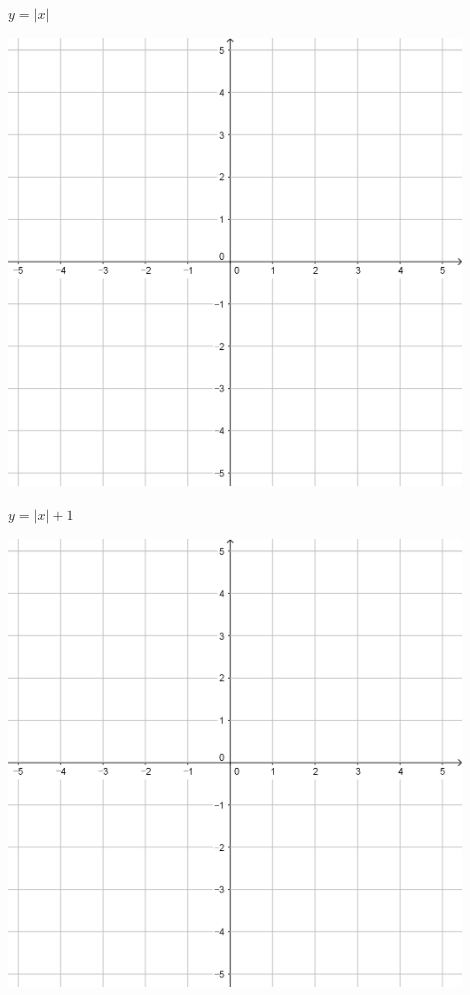 \documentclass{oblivoir}
\begin{document}
\clearpage
\begin{minipage}{0.45\textwidth}\centering
\(y=|x|\)
\par\bigskip\includegraphics[width=0.9\textwidth]{55}
\end{minipage}
\begin{minipage}{0.45\textwidth}\centering
\(y=|x|+1\)
\par\bigskip\includegraphics[width=0.9\textwidth]{55}
\end{minipage}\bigskip\bigskip\par
\end{document}

